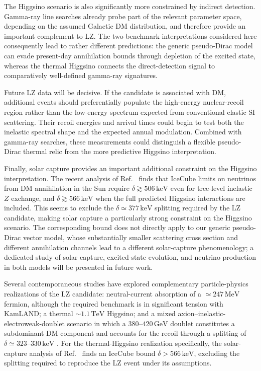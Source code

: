\documentclass[aps,prd,reprint,superscriptaddress,nofootinbib,longbibliography,floatfix]{revtex4-2}
\newcommand{\keV}{\mathrm{keV}}
\begin{document}
The Higgsino scenario is also significantly more constrained by indirect detection. Gamma-ray line searches already probe part of the relevant parameter space, depending on the assumed Galactic DM distribution, and therefore provide an important complement to LZ. The two benchmark interpretations considered here consequently lead to rather different predictions: the generic pseudo-Dirac model can evade present-day annihilation bounds through depletion of the excited state, whereas the thermal Higgsino connects the direct-detection signal to comparatively well-defined gamma-ray signatures.

Future LZ data will be decisive. If the candidate is associated with DM, additional events should preferentially populate the high-energy nuclear-recoil region rather than the low-energy spectrum expected from conventional elastic SI scattering. Their recoil energies and arrival times could begin to test both the inelastic spectral shape and the expected annual modulation. Combined with gamma-ray searches, these measurements could distinguish a flexible pseudo-Dirac thermal relic from the more predictive Higgsino interpretation.

Finally, solar capture provides an important additional constraint on the Higgsino interpretation. The recent analysis of Ref.~\cite{PospelovRamani2026} finds that IceCube limits on neutrinos from DM annihilation in the Sun require $\delta\gtrsim506\,\keV$ even for tree-level inelastic $Z$ exchange, and $\delta\gtrsim566\,\keV$ when the full predicted Higgsino interactions are included. This seems to exclude the $\delta\simeq377\,\keV$ splitting required by the LZ candidate, making solar capture a particularly strong constraint on the Higgsino scenario. The corresponding bound does not directly apply to our generic pseudo-Dirac vector model, whose substantially smaller scattering cross section and different annihilation channels lead to a different solar-capture phenomenology; a dedicated study of solar capture, excited-state evolution, and neutrino production in both models will be presented in future work.

Several contemporaneous studies have explored complementary particle-physics realizations of the LZ candidate: neutral-current absorption of a $\simeq247\,\mathrm{MeV}$ fermion, although the required benchmark is in significant tension with KamLAND; a thermal $\sim1.1\,\mathrm{TeV}$ Higgsino; and a mixed axion--inelastic-electroweak-doublet scenario in which a $380$--$420\,\mathrm{GeV}$ doublet constitutes a subdominant DM component and accounts for the recoil through a splitting of $\delta\simeq323$--$330\,\mathrm{keV}$ \cite{LouLu2026,WuZhangZhu2026,Visinelli2026}.
For the thermal-Higgsino realization specifically, the solar-capture analysis of Ref.~\cite{PospelovRamani2026} finds an IceCube bound $\delta>566\,\mathrm{keV}$, excluding the splitting required to reproduce the LZ event under its assumptions.
\end{document}
